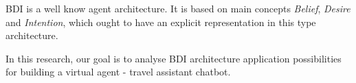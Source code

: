 \documentclass{llncs}
\begin{document}

\gls{BDI} \cite{rao1995bdi} is a well know agent architecture. It is based on main concepts  \emph{Belief}, \emph{Desire} and \emph{Intention}, which ought to have an explicit representation in this type architecture. 

In this research, our goal is to analyse \gls{BDI} architecture application possibilities for building a virtual agent - travel assistant chatbot.
\end{document}
